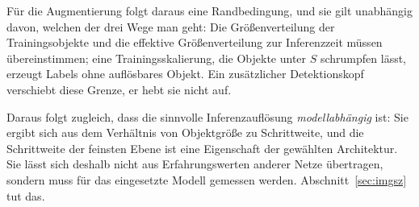 Für die Augmentierung folgt daraus eine Randbedingung, und sie gilt unabhängig
davon, welchen der drei Wege man geht: Die Größenverteilung der Trainingsobjekte
und die effektive Größenverteilung zur Inferenzzeit müssen übereinstimmen; eine
Trainingsskalierung, die Objekte unter $S$ schrumpfen lässt, erzeugt Labels ohne
auflösbares Objekt. Ein zusätzlicher Detektionskopf verschiebt diese Grenze, er
hebt sie nicht auf.

Daraus folgt zugleich, dass die sinnvolle Inferenzauflösung
\emph{modellabhängig} ist: Sie ergibt sich aus dem Verhältnis von
Objektgröße zu Schrittweite, und die Schrittweite der feinsten Ebene ist eine
Eigenschaft der gewählten Architektur. Sie lässt sich deshalb nicht aus
Erfahrungswerten anderer Netze übertragen, sondern muss für das eingesetzte
Modell gemessen werden. Abschnitt~\ref{sec:imgsz} tut das.

